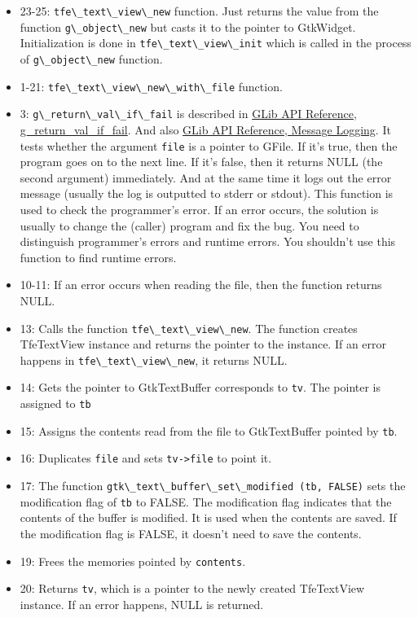 \begin{itemize}
\tightlist
\item
  23-25: \passthrough{\lstinline!tfe\_text\_view\_new!} function. Just
  returns the value from the function
  \passthrough{\lstinline!g\_object\_new!} but casts it to the pointer
  to GtkWidget. Initialization is done in
  \passthrough{\lstinline!tfe\_text\_view\_init!} which is called in the
  process of \passthrough{\lstinline!g\_object\_new!} function.
\item
  1-21: \passthrough{\lstinline!tfe\_text\_view\_new\_with\_file!}
  function.
\item
  3: \passthrough{\lstinline!g\_return\_val\_if\_fail!} is described in
  \href{https://docs.gtk.org/glib/func.return_val_if_fail.html}{GLib API
  Reference, g\_return\_val\_if\_fail}. And also
  \href{https://docs.gtk.org/glib/logging.html}{GLib API Reference,
  Message Logging}. It tests whether the argument
  \passthrough{\lstinline!file!} is a pointer to GFile. If it's true,
  then the program goes on to the next line. If it's false, then it
  returns NULL (the second argument) immediately. And at the same time
  it logs out the error message (usually the log is outputted to stderr
  or stdout). This function is used to check the programmer's error. If
  an error occurs, the solution is usually to change the (caller)
  program and fix the bug. You need to distinguish programmer's errors
  and runtime errors. You shouldn't use this function to find runtime
  errors.
\item
  10-11: If an error occurs when reading the file, then the function
  returns NULL.
\item
  13: Calls the function \passthrough{\lstinline!tfe\_text\_view\_new!}.
  The function creates TfeTextView instance and returns the pointer to
  the instance. If an error happens in
  \passthrough{\lstinline!tfe\_text\_view\_new!}, it returns NULL.
\item
  14: Gets the pointer to GtkTextBuffer corresponds to
  \passthrough{\lstinline!tv!}. The pointer is assigned to
  \passthrough{\lstinline!tb!}
\item
  15: Assigns the contents read from the file to GtkTextBuffer pointed
  by \passthrough{\lstinline!tb!}.
\item
  16: Duplicates \passthrough{\lstinline!file!} and sets
  \passthrough{\lstinline!tv->file!} to point it.
\item
  17: The function
  \passthrough{\lstinline!gtk\_text\_buffer\_set\_modified (tb, FALSE)!}
  sets the modification flag of \passthrough{\lstinline!tb!} to FALSE.
  The modification flag indicates that the contents of the buffer is
  modified. It is used when the contents are saved. If the modification
  flag is FALSE, it doesn't need to save the contents.
\item
  19: Frees the memories pointed by \passthrough{\lstinline!contents!}.
\item
  20: Returns \passthrough{\lstinline!tv!}, which is a pointer to the
  newly created TfeTextView instance. If an error happens, NULL is
  returned.
\end{itemize}

